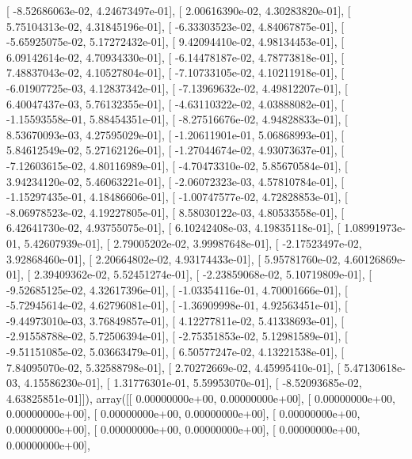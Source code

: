\documentclass{article}
\begin{document}
       [ -8.52686063e-02,   4.24673497e-01],
       [  2.00616390e-02,   4.30283820e-01],
       [  5.75104313e-02,   4.31845196e-01],
       [ -6.33303523e-02,   4.84067875e-01],
       [ -5.65925075e-02,   5.17272432e-01],
       [  9.42094410e-02,   4.98134453e-01],
       [  6.09142614e-02,   4.70934330e-01],
       [ -6.14478187e-02,   4.78773818e-01],
       [  7.48837043e-02,   4.10527804e-01],
       [ -7.10733105e-02,   4.10211918e-01],
       [ -6.01907725e-03,   4.12837342e-01],
       [ -7.13969632e-02,   4.49812207e-01],
       [  6.40047437e-03,   5.76132355e-01],
       [ -4.63110322e-02,   4.03888082e-01],
       [ -1.15593558e-01,   5.88454351e-01],
       [ -8.27516676e-02,   4.94828833e-01],
       [  8.53670093e-03,   4.27595029e-01],
       [ -1.20611901e-01,   5.06868993e-01],
       [  5.84612549e-02,   5.27162126e-01],
       [ -1.27044674e-02,   4.93073637e-01],
       [ -7.12603615e-02,   4.80116989e-01],
       [ -4.70473310e-02,   5.85670584e-01],
       [  3.94234120e-02,   5.46063221e-01],
       [ -2.06072323e-03,   4.57810784e-01],
       [ -1.15297435e-01,   4.18486606e-01],
       [ -1.00747577e-02,   4.72828853e-01],
       [ -8.06978523e-02,   4.19227805e-01],
       [  8.58030122e-03,   4.80533558e-01],
       [  6.42641730e-02,   4.93755075e-01],
       [  6.10242408e-03,   4.19835118e-01],
       [  1.08991973e-01,   5.42607939e-01],
       [  2.79005202e-02,   3.99987648e-01],
       [ -2.17523497e-02,   3.92868460e-01],
       [  2.20664802e-02,   4.93174433e-01],
       [  5.95781760e-02,   4.60126869e-01],
       [  2.39409362e-02,   5.52451274e-01],
       [ -2.23859068e-02,   5.10719809e-01],
       [ -9.52685125e-02,   4.32617396e-01],
       [ -1.03354116e-01,   4.70001666e-01],
       [ -5.72945614e-02,   4.62796081e-01],
       [ -1.36909998e-01,   4.92563451e-01],
       [ -9.44973010e-03,   3.76849857e-01],
       [  4.12277811e-02,   5.41338693e-01],
       [ -2.91558788e-02,   5.72506394e-01],
       [ -2.75351853e-02,   5.12981589e-01],
       [ -9.51151085e-02,   5.03663479e-01],
       [  6.50577247e-02,   4.13221538e-01],
       [  7.84095070e-02,   5.32588798e-01],
       [  2.70272669e-02,   4.45995410e-01],
       [  5.47130618e-03,   4.15586230e-01],
       [  1.31776301e-01,   5.59953070e-01],
       [ -8.52093685e-02,   4.63825851e-01]]), array([[  0.00000000e+00,   0.00000000e+00],
       [  0.00000000e+00,   0.00000000e+00],
       [  0.00000000e+00,   0.00000000e+00],
       [  0.00000000e+00,   0.00000000e+00],
       [  0.00000000e+00,   0.00000000e+00],
       [  0.00000000e+00,   0.00000000e+00],
\end{document}
